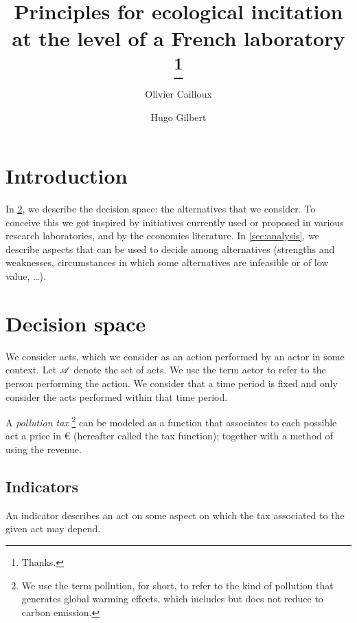 \documentclass[version=3.21, pagesize, twoside=off, bibliography=totoc, DIV=calc, fontsize=12pt, a4paper, french, english]{scrartcl}
\title{Principles for ecological incitation at the level of a French laboratory \thanks{Thanks.}}
\author{Olivier Cailloux}
\author{Hugo Gilbert}
\affil{Université Paris-Dauphine, PSL Research University, CNRS, LAMSADE, 75016 PARIS, FRANCE\\
	\href{mailto:olivier.cailloux@dauphine.fr}{olivier.cailloux@dauphine.fr}
}
\begin{document}
\maketitle

\section{Introduction}
\label{sec:intro}
In \cref{sec:alts}, we describe the decision space: the alternatives that we consider. To conceive this we got inspired by initiatives currently used or proposed in various research laboratories, and by the economics literature. In \cref{sec:analysis}, we describe aspects that can be used to decide among alternatives (strengths and weaknesses, circumstances in which some alternatives are infeasible or of low value, …).

\section{Decision space}
\label{sec:alts}
We consider acts, which we consider as an action performed by an actor in some context. 
Let $\mathscr{A}$ denote the set of acts.
We use the term actor to refer to the person performing the action. We consider that a time period is fixed and only consider the acts performed within that time period.

A \emph{pollution tax} 
\footnote{We use the term pollution, for short, to refer to the kind of pollution that generates global warming effects, which includes but does not reduce to carbon emission.} 
can be modeled as a function that associates to each possible act a price in € (hereafter called the tax function); together with a method of using the revenue.

\subsection{Indicators}
\label{sec:indic}
An indicator describes an act on some aspect on which the tax associated to the given act may depend.
\end{document}
